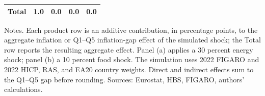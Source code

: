 \begin{table}[H]
\begin{tabular}[t]{lrrrr}
\textbf{Total} & \textbf{1.0} & \textbf{0.0} & \textbf{0.0} & \textbf{0.0}\\
\bottomrule
\end{tabular}
\par\vspace{0.35em}\footnotesize\noindent Notes. Each product row is an additive contribution, in percentage points, to the aggregate inflation or Q1--Q5 inflation-gap effect of the simulated shock; the Total row reports the resulting aggregate effect. Panel (a) applies a 30 percent energy shock; panel (b) a 10 percent food shock. The simulation uses 2022 FIGARO and 2022 HICP, RAS, and EA20 country weights. Direct and indirect effects sum to the Q1--Q5 gap before rounding. Sources: Eurostat, HBS, FIGARO, authors' calculations.
\end{table}
